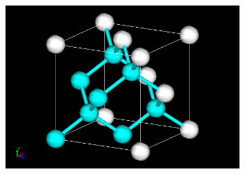 \documentclass[11pt, dvipdfmx]{beamer}
\begin{document}
\begin{frame}
\begin{columns}[totalwidth=\linewidth]
\begin{figure}
\centering
\includegraphics[width=0.8\textwidth]{./fig/dia.png}
\end{figure}

\end{columns}

\end{frame}
\end{document}
